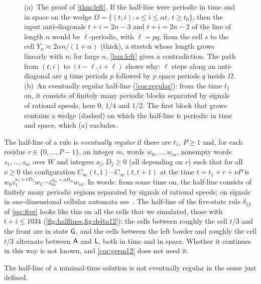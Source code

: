 \begin{figure}[t]
\centering

\caption{(a)~The proof of \cref{thm:left}. If the half-line were periodic in
time and in space on the wedge $\Omega=\{(t,i):s\le i\le\alpha t,\ t\ge t_0\}$,
then the input anti-diagonals $t+i=2n-3$ and $t+i=2n-2$ of the line of length
$n$ would be $\ell$-periodic, with $\ell=pq$, from the cell $s$ to the cell
$Y_n\approx2\alpha n/(1+\alpha)$ (thick), a stretch whose length grows
linearly with $n$; for large $n$, \cref{lem:left} gives a contradiction. The
path from $(t,i)$ to $(t-\ell,i+\ell)$ shows why: $\ell$ steps along an
anti-diagonal are $q$ time periods $p$ followed by $p$ space periods $q$
inside $\Omega$. (b)~An eventually regular half-line (\cref{cor:regular}):
from the time $t_1$ on, it consists of finitely many periodic blocks
separated by signals of rational speeds, here $0$, $1/4$ and $1/2$. The first
block that grows contains a wedge (dashed) on which the half-line is periodic
in time and space, which (a) excludes.}
\label{fig:wedge}
\end{figure}

The half-line of a rule is \emph{eventually regular} if there are $t_1$,
$P\ge1$ and, for each residue $r\in\{0,\dots,P-1\}$, an integer $m$, words
$w_0,\dots,w_m$, nonempty words $z_1,\dots,z_m$ over $W$ and integers
$a_j,D_j\ge0$ (all depending on $r$) such that for all $\nu\ge0$ the
configuration $C_\infty(t,1)\cdots C_\infty(t,t+1)$ at the time
$t=t_1+r+\nu P$ is $w_0z_1^{a_1+\nu D_1}w_1\cdots z_m^{a_m+\nu D_m}w_m$. In
words: from some time on, the half-line consists of finitely many periodic
regions separated by signals of rational speeds; on signals in one-dimensional
cellular automata see~\cite{MazoyerTerrier99}. The half-line of the five-state
rule $\delta_{12}$ of \cref{sec:five} looks like this on all the cells that we
simulated, those with $t+i\le1034$ (\cref{fig:halflines,fig:delta12}): the cells
between roughly the cell $t/3$ and the front are in state $\mathsf G$, and the cells
between the left border and roughly the cell $t/3$ alternate between $\mathsf A$ and
$\mathsf L$, both in time and in space. Whether it continues in this way is not
known, and \cref{cor:germ12} does not need it.

\begin{corollary}\label{cor:regular}
The half-line of a minimal-time solution is not eventually regular in the
sense just defined.
\end{corollary}

